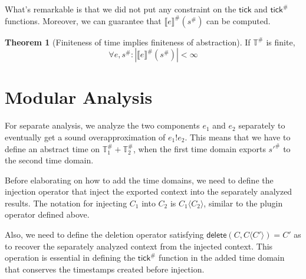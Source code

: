 \documentclass[acmsmall,screen,review]{acmart}
\theoremstyle{definition}
\newtheorem{thm}{Theorem}[section]
\newcommand*{\A}[1]{{#1}^{\#}}
\newcommand*{\Time}{\mathbb{T}}
\newcommand*{\ATime}{\A{\Time}}
\newcommand*{\link}[2]{{#1}\mathtt{!}{#2}}
\newcommand*{\sembracket}[1]{\lBrack{#1}\rBrack}
\newcommand*{\tick}{\mathsf{tick}}
\newcommand*{\inject}[2]{{#1}\langle{#2}\rangle}
\newcommand*{\delete}{\mathsf{delete}}
\begin{document}
What's remarkable is that we did not put any constraint on the $\tick$ and $\A{\tick}$ functions.
Moreover, we can guarantee that $\A{\sembracket{e}}(\A{s})$ can be computed.

\begin{thm}[Finiteness of time implies finiteness of abstraction]
  If $\ATime$ is finite,
  \[
    \forall e,\A{s}: |\A{\sembracket{e}}(\A{s})|<\infty
  \]
\end{thm}

\section{Modular Analysis}
For separate analysis, we analyze the two components $e_1$ and $e_2$ separately to eventually get a sound overapproximation of $\link{e_1}{e_2}$.
This means that we have to define an abstract time on $\ATime_1+\ATime_2$, when the first time domain exports $\A{s'}$ to the second time domain.

Before elaborating on how to add the time domains, we need to define the injection operator that inject the exported context into the separately analyzed results.
The notation for injecting $C_{1}$ into $C_{2}$ is $\inject{C_{1}}{C_{2}}$, similar to the plugin operator defined above.

Also, we need to define the deletion operator satisfying $\delete(C,\inject{C}{C'})=C'$ as to recover the separately analyzed context from the injected context.
This operation is essential in defining the $\A\tick$ function in the added time domain that conserves the timestamps created before injection.
\end{document}
